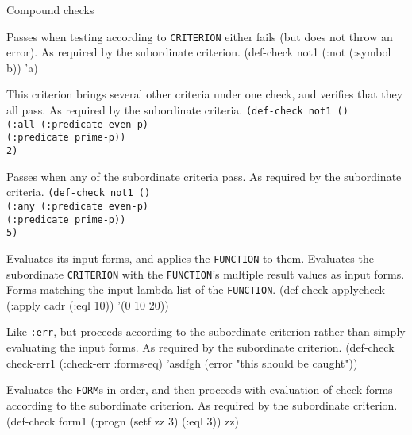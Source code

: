 \begin{criteriaGroup}{Compound checks}

{Passes when testing according to \texttt{CRITERION} either fails (but
does not throw an error).}
{As required by the subordinate criterion.}
{\noExpl}
{\singleEx}{(def-check not1 (:not (:symbol b)) 'a)}

{This criterion brings several other criteria under one check, and
verifies that they all pass.}
{As required by the subordinate criteria.}
{\noExpl}
{\tabbingEx}{\texttt{(de}\=\texttt{f-}\=\texttt{check not1 ()}
\\ \>\>\texttt{(:all }\=\texttt{(:predicate even-p)}
\\ \>\>\>\texttt{(:predicate prime-p))}
\\ \>\texttt{2)}}

{Passes when any of the subordinate criteria pass.}
{As required by the subordinate criteria.}
{\noExpl}
{\tabbingEx}{
\texttt{(de}\=\texttt{f-}\=\texttt{check not1 ()}
\\ \>\>\texttt{(:any }\=\texttt{(:predicate even-p)}
\\ \>\>\>\texttt{(:predicate prime-p))}
\\ \>\texttt{5)}}

{Evaluates its input forms, and applies the \texttt{FUNCTION} to them.
Evaluates the subordinate \texttt{CRITERION} with the
\texttt{FUNCTION}'s multiple result values as input forms.}
{Forms matching the input lambda list of the \texttt{FUNCTION}.}
{\noExpl}
{\singleEx}{(def-check applycheck (:apply cadr (:eql 10)) '(0 10 20))}

{Like \texttt{:err}, but proceeds according to the subordinate
criterion rather than simply evaluating the input forms.}
{As required by the subordinate criterion.}
{}
{\singleEx}
{(def-check check-err1 (:check-err :forms-eq) 'asdfgh (error "this should be caught"))}

{Evaluates the \texttt{FORM}s in order, and then proceeds with
evaluation of check forms according to the subordinate criterion.}
{As required by the subordinate criterion.}
{\noExpl}
{\singleEx}
{(def-check form1 (:progn (setf zz 3) (:eql 3)) zz)}


\end{criteriaGroup}
